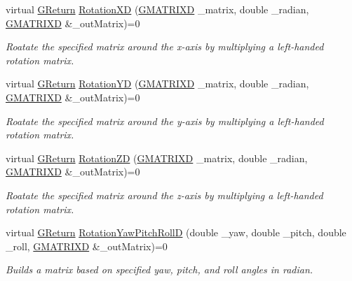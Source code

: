 \begin{DoxyCompactItemize}
virtual \mbox{\hyperlink{namespace_g_w_a67a839e3df7ea8a5c5686613a7a3de21}{G\+Return}} \mbox{\hyperlink{class_g_w_1_1_m_a_t_h_1_1_g_matrix_abb2cbb56bb2f3963807e20ba0fe591b3}{Rotation\+XD}} (\mbox{\hyperlink{struct_g_w_1_1_m_a_t_h_1_1_g_m_a_t_r_i_x_d}{G\+M\+A\+T\+R\+I\+XD}} \+\_\+matrix, double \+\_\+radian, \mbox{\hyperlink{struct_g_w_1_1_m_a_t_h_1_1_g_m_a_t_r_i_x_d}{G\+M\+A\+T\+R\+I\+XD}} \&\+\_\+out\+Matrix)=0
\begin{DoxyCompactList}\small\item\em Roatate the specified matrix around the x-\/axis by multiplying a left-\/handed rotation matrix. \end{DoxyCompactList}\item 
virtual \mbox{\hyperlink{namespace_g_w_a67a839e3df7ea8a5c5686613a7a3de21}{G\+Return}} \mbox{\hyperlink{class_g_w_1_1_m_a_t_h_1_1_g_matrix_a1f836790e81a0da00ad7e9e5b06969d4}{Rotation\+YD}} (\mbox{\hyperlink{struct_g_w_1_1_m_a_t_h_1_1_g_m_a_t_r_i_x_d}{G\+M\+A\+T\+R\+I\+XD}} \+\_\+matrix, double \+\_\+radian, \mbox{\hyperlink{struct_g_w_1_1_m_a_t_h_1_1_g_m_a_t_r_i_x_d}{G\+M\+A\+T\+R\+I\+XD}} \&\+\_\+out\+Matrix)=0
\begin{DoxyCompactList}\small\item\em Roatate the specified matrix around the y-\/axis by multiplying a left-\/handed rotation matrix. \end{DoxyCompactList}\item 
virtual \mbox{\hyperlink{namespace_g_w_a67a839e3df7ea8a5c5686613a7a3de21}{G\+Return}} \mbox{\hyperlink{class_g_w_1_1_m_a_t_h_1_1_g_matrix_ae219f6b6aeddcd2969e5812c8e0a481c}{Rotation\+ZD}} (\mbox{\hyperlink{struct_g_w_1_1_m_a_t_h_1_1_g_m_a_t_r_i_x_d}{G\+M\+A\+T\+R\+I\+XD}} \+\_\+matrix, double \+\_\+radian, \mbox{\hyperlink{struct_g_w_1_1_m_a_t_h_1_1_g_m_a_t_r_i_x_d}{G\+M\+A\+T\+R\+I\+XD}} \&\+\_\+out\+Matrix)=0
\begin{DoxyCompactList}\small\item\em Roatate the specified matrix around the z-\/axis by multiplying a left-\/handed rotation matrix. \end{DoxyCompactList}\item 
virtual \mbox{\hyperlink{namespace_g_w_a67a839e3df7ea8a5c5686613a7a3de21}{G\+Return}} \mbox{\hyperlink{class_g_w_1_1_m_a_t_h_1_1_g_matrix_ae63a0eacd6030eeed28dec461986e322}{Rotation\+Yaw\+Pitch\+RollD}} (double \+\_\+yaw, double \+\_\+pitch, double \+\_\+roll, \mbox{\hyperlink{struct_g_w_1_1_m_a_t_h_1_1_g_m_a_t_r_i_x_d}{G\+M\+A\+T\+R\+I\+XD}} \&\+\_\+out\+Matrix)=0
\begin{DoxyCompactList}\small\item\em Builds a matrix based on specified yaw, pitch, and roll angles in radian. \end{DoxyCompactList}\item 

\end{DoxyCompactItemize}
